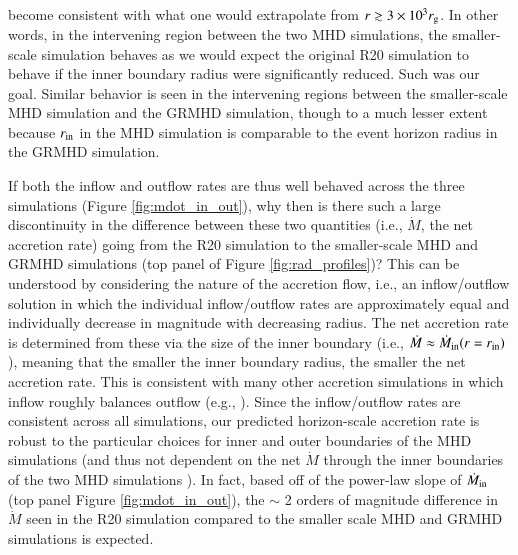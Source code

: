 \documentclass[twocolumn,twocolappendix,apjl,appendixfloats]{aastex63}
\begin{document}
become consistent with what one would extrapolate from $r\gtrsim 3 \times 10^3 r_{\rm g}$.   In other words, in the intervening region between the two MHD simulations, the smaller-scale simulation behaves as we would expect the original R20 simulation to behave if the inner boundary radius were significantly reduced. Such was our goal.    Similar behavior is seen in the intervening regions between the smaller-scale MHD simulation and the GRMHD simulation, though to a much lesser extent because $r_{\rm in}$ in the MHD simulation is comparable to the event horizon radius in the GRMHD simulation. 

If both the inflow and outflow rates are thus well behaved across the three simulations (Figure \ref{fig:mdot_in_out}), why then is there such a large discontinuity in the difference between these two quantities (i.e., $\dot M$, the net accretion rate) going from the R20 simulation to the smaller-scale MHD and GRMHD simulations (top panel of Figure \ref{fig:rad_profiles})? This can be understood by considering the nature of the accretion flow, i.e., an inflow/outflow solution in which the individual inflow/outflow rates are approximately equal and individually decrease in magnitude with decreasing radius.  The net accretion rate is determined from these via the size of the inner boundary (i.e., $\dot M \approx \dot M_{\rm in}(r = r_{\rm in})$), meaning that the smaller the inner boundary radius, the smaller the net accretion rate. This is consistent with many other accretion simulations in which inflow roughly balances outflow (e.g., \citealt{Stone1999,Inayoshi2018}).  
Since the inflow/outflow rates are consistent across all simulations, our predicted horizon-scale accretion rate is robust to the particular choices for inner and outer boundaries of the MHD simulations (and thus not dependent on the net $\dot M$ through the inner boundaries of the two MHD simulations ). In fact, based off of the power-law slope of $\dot M_{\rm in}$ (top panel Figure \ref{fig:mdot_in_out}), the $\sim$ 2 orders of magnitude difference in $\dot M$ seen in the R20 simulation compared to the smaller scale MHD and GRMHD simulations is expected.  
\end{document}
